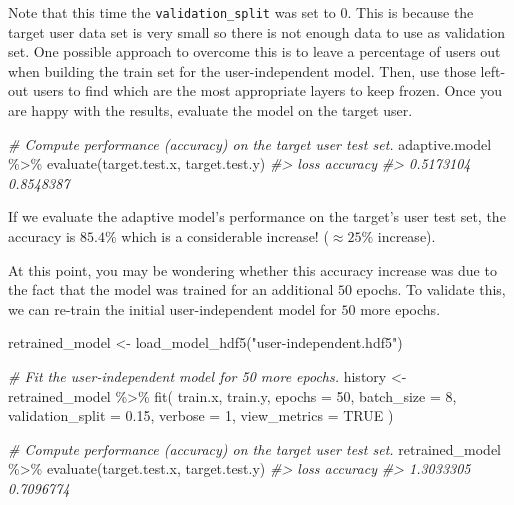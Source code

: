 \documentclass[
  11pt,
]{krantz}
\makeatletter
\newenvironment{Shaded}{\begin{snugshade}}{\end{snugshade}}
\newcommand{\AttributeTok}[1]{\textcolor[rgb]{0.61,0.61,0.61}{#1}}
\newcommand{\CommentTok}[1]{\textcolor[rgb]{0.37,0.37,0.37}{\textit{#1}}}
\newcommand{\ConstantTok}[1]{\textcolor[rgb]{0,0,0}{#1}}
\newcommand{\DecValTok}[1]{\textcolor[rgb]{0.06,0.06,0.06}{#1}}
\newcommand{\FloatTok}[1]{\textcolor[rgb]{0.06,0.06,0.06}{#1}}
\newcommand{\FunctionTok}[1]{\textcolor[rgb]{0,0,0}{#1}}
\newcommand{\NormalTok}[1]{#1}
\newcommand{\OtherTok}[1]{\textcolor[rgb]{0.37,0.37,0.37}{#1}}
\newcommand{\SpecialCharTok}[1]{\textcolor[rgb]{0,0,0}{#1}}
\newcommand{\StringTok}[1]{\textcolor[rgb]{0.5,0.5,0.5}{#1}}
\newenvironment{kframe}{%
\medskip{}
\setlength{\fboxsep}{.8em}
 \def\at@end@of@kframe{}%
 \ifinner\ifhmode%
  \def\at@end@of@kframe{\end{minipage}}%
  \begin{minipage}{\columnwidth}%
 \fi\fi%
 \def\FrameCommand##1{\hskip\@totalleftmargin \hskip-\fboxsep
 \colorbox{shadecolor}{##1}\hskip-\fboxsep
     \hskip-\linewidth \hskip-\@totalleftmargin \hskip\columnwidth}%
 \MakeFramed {\advance\hsize-\width
   \@totalleftmargin\z@ \linewidth\hsize
   \@setminipage}}%
 {\par\unskip\endMakeFramed%
 \at@end@of@kframe}
\newenvironment{rmdblock}[1]
  {
  \begin{itemize}
  \renewcommand{\labelitemi}{
    \raisebox{-.7\height}[0pt][0pt]{
      {\setkeys{Gin}{width=3em,keepaspectratio}\texttt{[image: images/icons/\#1]}}
    }
  }
  \setlength{\fboxsep}{1em}
  \begin{kframe}
  \item
  }
  {
  \end{kframe}
  \end{itemize}
  }
\newenvironment{rmdcaution}
  {\begin{rmdblock}{caution}}
  {\end{rmdblock}}
\makeatother
\begin{document}
\begin{rmdcaution}
Note that this time the \texttt{validation\_split} was set to \(0\). This is because the target user data set is very small so there is not enough data to use as validation set. One possible approach to overcome this is to leave a percentage of users out when building the train set for the user-independent model. Then, use those left-out users to find which are the most appropriate layers to keep frozen. Once you are happy with the results, evaluate the model on the target user.
\end{rmdcaution}

\begin{Shaded}
\begin{Highlighting}[]
\CommentTok{\# Compute performance (accuracy) on the target user test set.}
\NormalTok{adaptive.model }\SpecialCharTok{\%\textgreater{}\%} \FunctionTok{evaluate}\NormalTok{(target.test.x, target.test.y)}
\CommentTok{\#\textgreater{}      loss  accuracy }
\CommentTok{\#\textgreater{} 0.5173104 0.8548387}
\end{Highlighting}
\end{Shaded}

If we evaluate the adaptive model's performance on the target's user test set, the accuracy is \(85.4\%\) which is a considerable increase! (\(\approx 25\%\) increase).

At this point, you may be wondering whether this accuracy increase was due to the fact that the model was trained for an additional \(50\) epochs. To validate this, we can re-train the initial user-independent model for \(50\) more epochs.

\begin{Shaded}
\begin{Highlighting}[]
\NormalTok{retrained\_model }\OtherTok{\textless{}{-}} \FunctionTok{load\_model\_hdf5}\NormalTok{(}\StringTok{"user{-}independent.hdf5"}\NormalTok{)}

\CommentTok{\# Fit the user{-}independent model for 50 more epochs.}
\NormalTok{history }\OtherTok{\textless{}{-}}\NormalTok{ retrained\_model }\SpecialCharTok{\%\textgreater{}\%} \FunctionTok{fit}\NormalTok{(}
\NormalTok{  train.x, train.y,}
  \AttributeTok{epochs =} \DecValTok{50}\NormalTok{,}
  \AttributeTok{batch\_size =} \DecValTok{8}\NormalTok{,}
  \AttributeTok{validation\_split =} \FloatTok{0.15}\NormalTok{,}
  \AttributeTok{verbose =} \DecValTok{1}\NormalTok{,}
  \AttributeTok{view\_metrics =} \ConstantTok{TRUE}
\NormalTok{)}

\CommentTok{\# Compute performance (accuracy) on the target user test set.}
\NormalTok{retrained\_model }\SpecialCharTok{\%\textgreater{}\%} \FunctionTok{evaluate}\NormalTok{(target.test.x, target.test.y)}
\CommentTok{\#\textgreater{}      loss  accuracy }
\CommentTok{\#\textgreater{} 1.3033305 0.7096774}
\end{Highlighting}
\end{Shaded}
\end{document}
